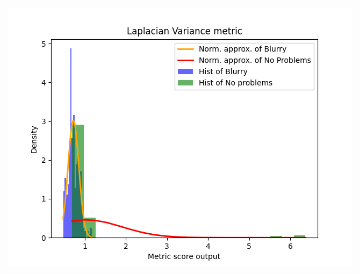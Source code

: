 \begin{figure}[H]
\begin{subfigure}[t]{0.48\textwidth}
        \caption{}
        \label{fig:LV_thresh}
    \end{subfigure}\hspace{1em}
    \begin{subfigure}[t]{0.48\textwidth}
        \includegraphics[width=\textwidth]{Figures/results_on_thresholds/output_dens_lv.png}
        \caption{}
        \label{fig:LV_dens}
    \end{subfigure}\hspace{1em}
    \caption{}
    \label{fig:LV_final}
\end{figure}

